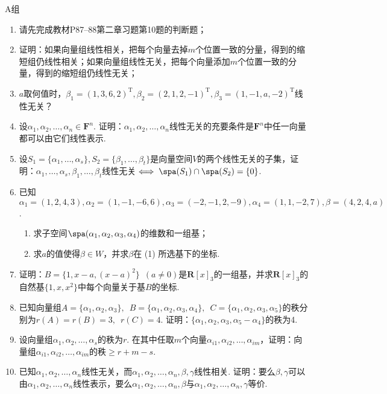 \centerline{\heiti A组}
\begin{enumerate}
    \item 请先完成教材P87--88第二章习题第10题的判断题；

    \item 证明：如果向量组线性相关，把每个向量去掉$m$个位置一致的分量，得到的缩短组仍线性相关；如果向量组线性无关，把每个向量添加$m$个位置一致的分量，得到的缩短组仍线性无关；

    \item $a$取何值时，$\beta_1=(1,3,6,2)^\mathrm{T},\beta_2=(2,1,2,-1)^\mathrm{T},\beta_3=(1,-1,a,-2)^\mathrm{T}$线性无关？

    \item 设$\alpha_1,\alpha_2,\ldots,\alpha_n\in\mathbf{F}^n$. 证明：$\alpha_1,\alpha_2,\ldots,\alpha_n$线性无关的充要条件是$\mathbf{F}^n$中任一向量都可以由它们线性表示.

    \item 设$S_1=\{\alpha_1,\ldots,\alpha_s\},S_2=\{\beta_1,\ldots,\beta_t\}$是向量空间$V$的两个线性无关的子集，证明：$\alpha_1,\ldots,\alpha_s,\beta_1,\ldots,\beta_t$线性无关$\iff \spa(S_1)\cap \spa(S_2)=\{0\}$.

    \item 已知$\alpha_1=(1,2,4,3),\alpha_2=(1,-1,-6,6),\alpha_3=(-2,-1,2,-9),\alpha_4=(1,1,-2,7),\beta=(4,2,4,a)$.
          \begin{enumerate}
              \item 求子空间$\spa(\alpha_1,\alpha_2,\alpha_3,\alpha_4)$的维数和一组基；

              \item 求$a$的值使得$\beta\in W$，并求$\beta$在 (1) 所选基下的坐标.
          \end{enumerate}

    \item 证明：$B=\{1,x-a,(x-a)^2\}\enspace(a\neq 0)$是$\mathbf{R}[x]_3$的一组基，并求$\mathbf{R}[x]_3$的自然基$\{1,x,x^2\}$中每个向量关于基$B$的坐标.

    \item 已知向量组$A=\{\alpha_1,\alpha_2,\alpha_3\},\enspace B=\{\alpha_1,\alpha_2,\alpha_3,\alpha_4\},\enspace C=\{\alpha_1,\alpha_2,\alpha_3,\alpha_5\}$的秩分别为$r(A)=r(B)=3,\enspace r(C)=4$. 证明：$\{\alpha_1,\alpha_2,\alpha_3,\alpha_5-\alpha_4\}$的秩为4.

    \item 设向量组$\alpha_1,\alpha_2,\ldots,\alpha_s$的秩为$r$. 在其中任取$m$个向量$\alpha_{i1},\alpha_{i2},\ldots,\alpha_{im}$，证明：向量组$\alpha_{i1},\alpha_{i2},\ldots,\alpha_{im}$的秩$\geqslant r+m-s$.

    \item 已知$\alpha_1,\alpha_2,\ldots,\alpha_n$线性无关，而$\alpha_1,\alpha_2,\ldots,\alpha_n,\beta,\gamma$线性相关. 证明：要么$\beta,\gamma$可以由$\alpha_1,\alpha_2,\ldots,\alpha_n$线性表示，要么$\alpha_1,\alpha_2,\ldots,\alpha_n,\beta$与$\alpha_1,\alpha_2,\ldots,\alpha_n,\gamma$等价.
\end{enumerate}

